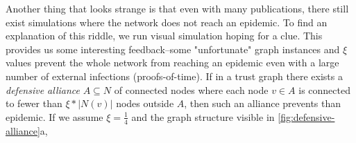 Another thing that looks strange is that even with many publications, there still exist simulations where the network does not reach an epidemic. To find an explanation of this riddle, we run visual simulation hoping for a clue. This provides us some interesting feedback--some "unfortunate" graph instances and $\xi$ values prevent the whole network from reaching an epidemic even with a large number of external infections (proofs-of-time).
If in a trust graph there exists a \textit{defensive alliance} $A \subseteq N$ of connected nodes where each node $v \in A$ is connected to fewer than $\xi * |N(v)|$ nodes outside $A$, then such an alliance prevents than epidemic. If we assume $\xi = \frac{1}{4}$ and the graph structure visible in \ref{fig:defensive-alliance}a,
\begin{figure}[h!]
 \hfill 	
\end{figure}

